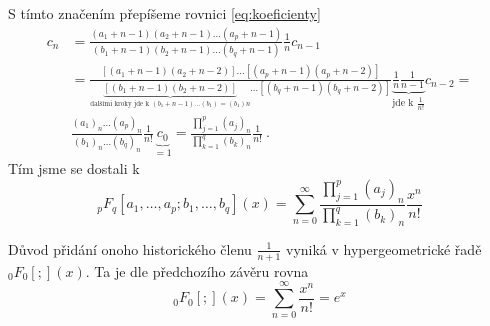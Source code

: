 S tímto značením přepíšeme rovnici \ref{eq:koeficienty}
\begin{align*}
    c_n &= \frac{(a_1+n-1)(a_2+n-1)\dots(a_p+n-1)}{(b_1+n-1)(b_2+n-1)\dots(b_q+n-1)}\frac{1}{n}c_{n-1} \\
    &=  \frac{[(a_1+n-1)(a_2+n-2)]\dots[(a_p+n-1)(a_p+n-2)]}{\underbrace{[(b_1+n-1)(b_2+n-2)]}_{\text{dalšími kroky jde k }(b_1+n-1)\dots(b_1) = (b_1)n}\dots[(b_q+n-1)(b_q+n-2)]}\underbrace{\frac{1}{n}\frac{1}{n-1}}_{\text{jde k }\frac{1}{n!}} c_{n-2} = \\
    &\frac{(a_1)_n\dots(a_p)_n}{(b_1)_n\dots(b_q)_n}\frac{1}{n!}\underbrace{c_0}_{=1} = \frac{\prod\limits_{j=1}^p(a_j)_n}{\prod\limits_{k=1}^q(b_k)_n}\frac{1}{n!}\:.
\end{align*}
Tím jsme se dostali k 
$$\boxed{{}_pF_q[a_1,\dots,a_p;b_1,\dots,b_q](x) = \sum\limits_{n=0}^\infty \frac{\prod\limits_{j=1}^p(a_j)_n}{\prod\limits_{k=1}^q(b_k)_n}\frac{x^n}{n!}}$$


Důvod přidání onoho historického členu $\frac{1}{n+1}$ vyniká v hypergeometrické řadě ${}_0F_0[;](x)$. Ta je dle předchozího závěru rovna
$${}_0F_0[;](x)=\sum\limits_{n=0}^\infty\frac{x^n}{n!}=e^x$$


